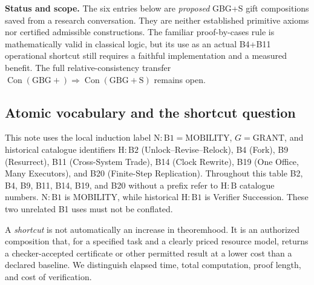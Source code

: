 \documentclass[11pt,letterpaper]{article}
\theoremstyle{definition}\newtheorem{definition}[theorem]{Definition}\newtheorem{example}[theorem]{Example}
\theoremstyle{remark}\newtheorem{remark}[theorem]{Remark}
\newcommand{\Con}{\operatorname{Con}}
\begin{document}
\textbf{Status and scope.} The six entries below are \emph{proposed} GBG+S gift compositions saved from a research conversation. They are neither established primitive axioms nor certified admissible constructions. The familiar proof-by-cases rule is mathematically valid in classical logic, but its use as an actual B4+B11 operational shortcut still requires a faithful implementation and a measured benefit. The full relative-consistency transfer \(\Con(\mathrm{GBG+})\Rightarrow\Con(\mathrm{GBG+S})\) remains open.


\subsection*{Atomic vocabulary and the shortcut question}
This note uses the local induction label \(\mathrm{N{:}B1}=\text{MOBILITY}\), \(G=\text{GRANT}\), and historical catalogue identifiers \(\mathrm{H{:}B2}\) (Unlock--Revise--Relock), B4 (Fork), B9 (Resurrect), B11 (Cross-System Trade), B14 (Clock Rewrite), B19 (One Office, Many Executors), and B20 (Finite-Step Replication). Throughout this table B2, B4, B9, B11, B14, B19, and B20 without a prefix refer to \(\mathrm{H{:}B}\) catalogue numbers. \(\mathrm{N{:}B1}\) is MOBILITY, while historical \(\mathrm{H{:}B1}\) is Verifier Succession. These two unrelated B1 uses must not be conflated.

A \emph{shortcut} is not automatically an increase in theoremhood. It is an authorized composition that, for a specified task and a clearly priced resource model, returns a checker-accepted certificate or other permitted result at a lower cost than a declared baseline. We distinguish elapsed time, total computation, proof length, and cost of verification.
\end{document}
